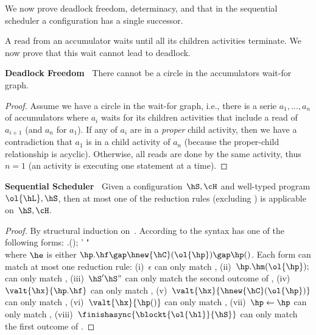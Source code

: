 We now prove deadlock freedom, determinacy, and that in the sequential scheduler a configuration has a single successor.

A read from an accumulator waits until all its children activities terminate.
We now prove that this wait cannot lead to deadlock.
\begin{Lemma}
\textbf{Deadlock Freedom~}
There cannot be a circle in the accumulators wait-for graph.
\end{Lemma}
\begin{proof}
Assume we have a circle in the wait-for graph, i.e., 
	there is a serie $a_1, \ldots, a_n$ of accumulators where $a_i$ waits for its children activities that include a read of $a_{i+1}$
	(and $a_n$ for $a_1$).
If any of $a_i$ are in a \emph{proper} child activity, then we have a contradiction that $a_1$ is in a child activity of $a_n$
	(because the proper-child relationship is acyclic).
Otherwise, all reads are done by the same activity, thus $n=1$ (an activity is executing one statement at a time).
\end{proof}

\begin{Lemma}
\textbf{Sequential Scheduler~}
Given a configuration~$\hS,\cH$ and well-typed program $\ol{\hL},\hS$,
    then at most one of the reduction rules (excluding )
    is applicable on~$\hS,\cH$.
\label{Lemma:Sequential}
\end{Lemma}
\begin{proof}
By structural induction on~\hS.
According to the syntax \hS has one of the following forms:
	\beqst
	\epsilon
	\gap 
	\hp.\hm(\ol{\hp});
	\gap  
	\hS' \hS" 
	\gap 
	\valt{\hx}{\he} 
	\\
	\hp \leftarrow \hp
	\gap 
	\finishasync{\blockt{\ol{\hl}}{\hS}}
	\eeq
	where $\he$ is either
	$\hp.\hf  \gap  \hnew{\hC}(\ol{\hp}) \gap \hp()$.
Each form can match at most one reduction rule:
	(i)~$\epsilon$ can only match ,
	(ii)~$\hp.\hm(\ol{\hp});$ can only match ,
	(iii)~$\hS' \hS"$ can only match the second outcome of ,
	(iv)~$\valt{\hx}{\hp.\hf}$ can only match ,
	(v)~$\valt{\hx}{\hnew{\hC}(\ol{\hp})}$ can only match ,
	(vi)~$\valt{\hx}{\hp()}$ can only match ,
	(vii)~$\hp \leftarrow \hp$ can only match ,
	(viii)~$\finishasync{\blockt{\ol{\hl}}{\hS}}$ can only match the first outcome of .
\end{proof}


